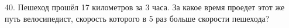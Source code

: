40. Пешеход прошёл 17 километров за 3 часа. За какое время проедет этот же путь велосипедист, скорость которого в 5 раз больше скорости пешехода?\\
